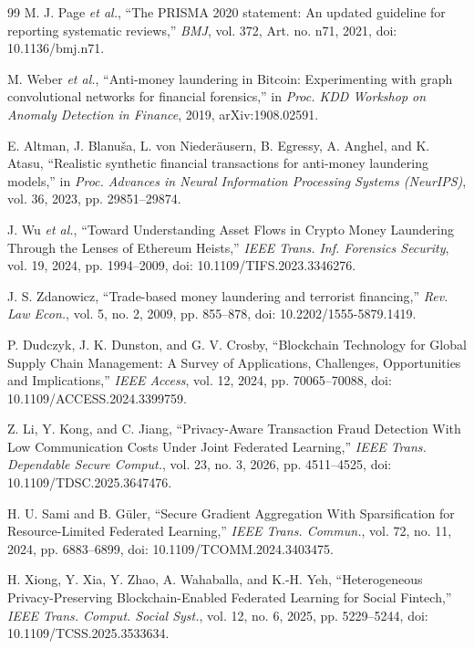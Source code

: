 \documentclass[journal]{IEEEtran}
\begin{document}
\begin{thebibliography}{99}
M. J. Page \emph{et al.}, ``The PRISMA 2020 statement: An updated guideline for reporting systematic reviews,'' \emph{BMJ}, vol. 372, Art. no. n71, 2021, doi: 10.1136/bmj.n71.

M. Weber \emph{et al.}, ``Anti-money laundering in Bitcoin: Experimenting with graph convolutional networks for financial forensics,'' in \emph{Proc. KDD Workshop on Anomaly Detection in Finance}, 2019, arXiv:1908.02591.

E. Altman, J. Blanu\v{s}a, L. von Nieder\"ausern, B. Egressy, A. Anghel, and K. Atasu, ``Realistic synthetic financial transactions for anti-money laundering models,'' in \emph{Proc. Advances in Neural Information Processing Systems (NeurIPS)}, vol. 36, 2023, pp. 29851--29874.

J. Wu \emph{et al.}, ``Toward Understanding Asset Flows in Crypto Money Laundering Through the Lenses of Ethereum Heists,'' \emph{IEEE Trans. Inf. Forensics Security}, vol. 19, 2024, pp. 1994--2009, doi: 10.1109/TIFS.2023.3346276.

J. S. Zdanowicz, ``Trade-based money laundering and terrorist financing,'' \emph{Rev. Law Econ.}, vol. 5, no. 2, 2009, pp. 855--878, doi: 10.2202/1555-5879.1419.

P. Dudczyk, J. K. Dunston, and G. V. Crosby, ``Blockchain Technology for Global Supply Chain Management: A Survey of Applications, Challenges, Opportunities and Implications,'' \emph{IEEE Access}, vol. 12, 2024, pp. 70065--70088, doi: 10.1109/ACCESS.2024.3399759.

Z. Li, Y. Kong, and C. Jiang, ``Privacy-Aware Transaction Fraud Detection With Low Communication Costs Under Joint Federated Learning,'' \emph{IEEE Trans. Dependable Secure Comput.}, vol. 23, no. 3, 2026, pp. 4511--4525, doi: 10.1109/TDSC.2025.3647476.

H. U. Sami and B. G\"uler, ``Secure Gradient Aggregation With Sparsification for Resource-Limited Federated Learning,'' \emph{IEEE Trans. Commun.}, vol. 72, no. 11, 2024, pp. 6883--6899, doi: 10.1109/TCOMM.2024.3403475.

H. Xiong, Y. Xia, Y. Zhao, A. Wahaballa, and K.-H. Yeh, ``Heterogeneous Privacy-Preserving Blockchain-Enabled Federated Learning for Social Fintech,'' \emph{IEEE Trans. Comput. Social Syst.}, vol. 12, no. 6, 2025, pp. 5229--5244, doi: 10.1109/TCSS.2025.3533634.


\end{thebibliography}
\end{document}
